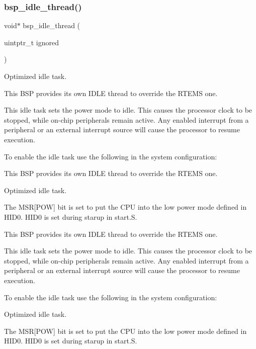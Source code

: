 \subsubsection{\texorpdfstring{bsp\_idle\_thread()}{bsp\_idle\_thread()}}
{\footnotesize\ttfamily void$\ast$ bsp\+\_\+idle\+\_\+thread (\begin{DoxyParamCaption}\item[{uintptr\+\_\+t}]{ignored }\end{DoxyParamCaption})}



Optimized idle task. 

This B\+SP provides its own I\+D\+LE thread to override the R\+T\+E\+MS one.

This idle task sets the power mode to idle. This causes the processor clock to be stopped, while on-\/chip peripherals remain active. Any enabled interrupt from a peripheral or an external interrupt source will cause the processor to resume execution.

To enable the idle task use the following in the system configuration\+:


\begin{DoxyCode}{0}
\DoxyCodeLine{\textcolor{preprocessor}{\#include <bsp.h>}}
\DoxyCodeLine{}
\DoxyCodeLine{\textcolor{preprocessor}{\#define CONFIGURE\_INIT}}
\DoxyCodeLine{}
\DoxyCodeLine{\textcolor{preprocessor}{\#define CONFIGURE\_IDLE\_TASK\_BODY bsp\_idle\_thread}}
\DoxyCodeLine{}
\end{DoxyCode}


This B\+SP provides its own I\+D\+LE thread to override the R\+T\+E\+MS one.

Optimized idle task.

The M\+SR\mbox{[}P\+OW\mbox{]} bit is set to put the C\+PU into the low power mode defined in H\+I\+D0. H\+I\+D0 is set during starup in start.\+S.

This B\+SP provides its own I\+D\+LE thread to override the R\+T\+E\+MS one.

This idle task sets the power mode to idle. This causes the processor clock to be stopped, while on-\/chip peripherals remain active. Any enabled interrupt from a peripheral or an external interrupt source will cause the processor to resume execution.

To enable the idle task use the following in the system configuration\+:


\begin{DoxyCode}{0}
\DoxyCodeLine{\textcolor{preprocessor}{\#include <bsp.h>}}
\DoxyCodeLine{}
\DoxyCodeLine{\textcolor{preprocessor}{\#define CONFIGURE\_INIT}}
\DoxyCodeLine{}
\DoxyCodeLine{\textcolor{preprocessor}{\#define CONFIGURE\_IDLE\_TASK\_BODY bsp\_idle\_thread}}
\DoxyCodeLine{}
\end{DoxyCode}


Optimized idle task.

The M\+SR\mbox{[}P\+OW\mbox{]} bit is set to put the C\+PU into the low power mode defined in H\+I\+D0. H\+I\+D0 is set during starup in start.\+S. 